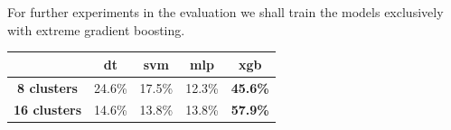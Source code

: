 For further experiments in the evaluation we shall train the models exclusively with extreme gradient boosting.

\begin{table}[!ht]
	{\begin{tabular}{ | c | c | c | c | c |}
		\hline
		& \textbf{dt} & \textbf{svm} & \textbf{mlp} & \textbf{xgb} \\ \hline
		\textbf{8 clusters} & 24.6\% & 17.5\% & 12.3\% & \textbf{45.6\%} \\ \hline
		\textbf{16 clusters} & 14.6\% & 13.8\% & 13.8\% & \textbf{57.9\%} \\ \hline
	\end{tabular}}
\label{evaluation:best_model_method}
\end{table}


